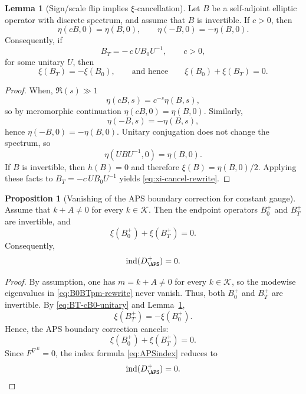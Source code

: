 \documentclass[11pt]{article}
\theoremstyle{definition}
\newtheorem{lemma}[theorem]{Lemma}
\newtheorem{proposition}[theorem]{Proposition}
\DeclareMathOperator{\ind}{ind}
\numberwithin{equation}{section}
\begin{document}
\begin{lemma}[Sign/scale flip implies $\xi$-cancellation]
\label{lem:xi-sign-scale}
Let $B$ be a self-adjoint elliptic operator with discrete spectrum, and assume that $B$ is invertible.
If $c>0$, then
\begin{equation}
\eta(cB,0)=\eta(B,0),
\qquad
\eta(-B,0)=-\eta(B,0).
\end{equation}
Consequently, if
\begin{equation}
B_T=-\,c\,U B_0 U^{-1},
\qquad c>0,
\end{equation}
for some unitary $U$, then
\begin{equation}
\label{eq:xi-cancel-rewrite}
\xi(B_T)=-\xi(B_0),
\qquad\text{and hence}\qquad
\xi(B_0)+\xi(B_T)=0.
\end{equation}
\end{lemma}

\begin{proof}
When, $\Re(s)\gg 1$
\begin{equation}
\eta(cB,s)=c^{-s}\eta(B,s),
\end{equation}
so by meromorphic continuation $\eta(cB,0)=\eta(B,0)$.
Similarly,
\begin{equation}
\eta(-B,s)=-\eta(B,s),
\end{equation}
hence $\eta(-B,0)=-\eta(B,0)$.
Unitary conjugation does not change the spectrum, so
\begin{equation}
\eta(U B U^{-1},0)=\eta(B,0).
\end{equation}
If $B$ is invertible, then $h(B)=0$ and therefore $\xi(B)=\eta(B,0)/2$.
Applying these facts to $B_T=-c\,U B_0 U^{-1}$ yields \eqref{eq:xi-cancel-rewrite}.
\end{proof}

\begin{proposition}[Vanishing of the APS boundary correction for constant gauge]
\label{prop:aps-cancellation-constant-gauge}
Assume that $k+A\neq 0$ for every $k\in\mathcal K$. Then the endpoint operators $B_0^+$ and $B_T^+$ are invertible, and
\begin{equation}
\xi(B_0^+)+\xi(B_T^+)=0.
\end{equation}
Consequently,
\begin{equation}
\ind(D^+_{\APS})=0.
\end{equation}
\end{proposition}

\begin{proof}
By assumption, one has $m=k+A\neq 0$ for every $k\in\mathcal K$, so the modewise eigenvalues in \eqref{eq:B0BTpm-rewrite} never vanish. Thus, both $B_0^+$ and $B_T^+$ are invertible.
By \eqref{eq:BT-cB0-unitary} and Lemma~\ref{lem:xi-sign-scale},
\begin{equation}
\xi(B_T^+)=-\xi(B_0^+).
\end{equation}
Hence, the APS boundary correction cancels:
\begin{equation}
\xi(B_0^+)+\xi(B_T^+)=0.
\end{equation}
Since $F^{\nabla^E}=0$, the index formula \eqref{eq:APSindex} reduces to
\begin{equation}
\ind(D^+_{\APS})=0.
\end{equation}
\end{proof}
\end{document}
